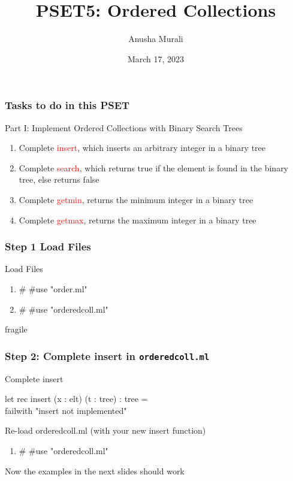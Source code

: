 \documentclass{beamer}
\title{PSET5: Ordered Collections}
\date{March 17, 2023}
\author{Anusha Murali}
\begin{document}

\begin{frame}[fragile]
\titlepage

\end{frame}


\begin{frame}[fragile]
\frametitle{Tasks to do in this PSET}

\begin{block}{Part I: Implement Ordered Collections with Binary Search Trees}
\begin{enumerate}
\item Complete \textcolor{red}{insert}, which inserts an arbitrary integer in a binary tree
\item Complete \textcolor{red}{search}, which returns true if the element is found in the binary tree, else returns false
\item Complete \textcolor{red}{getmin}, returns the minimum integer in a binary tree
\item Complete \textcolor{red}{getmax}, returns the maximum integer in a binary tree
\end{enumerate}
\end{block}
\end{frame}


\begin{frame}[fragile]
\frametitle{Step 1 Load Files}

\begin{block}{Load Files}
\begin{enumerate}
\item \# \#use "order.ml"
\item \# \#use "orderedcoll.ml"
\end{enumerate}
\end{block}
\end{frame}


\begin{frame}{fragile}
\frametitle{Step 2: Complete insert in {\tt orderedcoll.ml}}

\begin{alertblock}{Complete insert}

\hspace*{1in} let rec insert (x : elt) (t : tree) : tree =  \\
\hspace*{1.15in}      failwith "insert not implemented"
\end{alertblock}

\begin{block}{Re-load orderedcoll.ml (with your new insert function)}
\begin{enumerate}
\item \# \#use "orderedcoll.ml"
\end{enumerate}
\end{block}

\begin{example}
Now the examples in the next slides should work
\end{example}
\end{frame}
      
\end{document}
